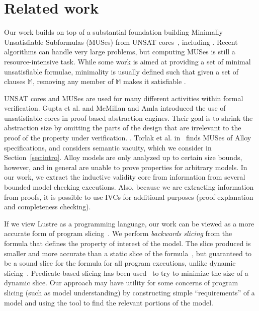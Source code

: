 \section{Related work}
\label{sec:related}


Our work builds on top of a substantial foundation building Minimally Unsatisfiable Subformulas
(MUSes) from UNSAT cores~\cite{Cimatti2007:UNSAT}, including \cite{marques2010minimal, belov2012towards, ryvchin2011faster, belov2012computing, nadel2010boosting}.  Recent algorithms can handle very large problems, but computing MUSes is still a resource-intensive task.  While some work is aimed at providing a set of minimal unsatisfiable formulae, minimality is usually defined such that given a set of clauses $\mathbb{M}$, removing any member of $\mathbb{M}$ makes it satisfiable \cite{belov2012computing}. 

UNSAT cores and MUSes are used for many different activities within formal verification.  Gupta et al. \cite{gupta2003iterative} and McMillan and Amla \cite{mcmillan2003automatic} introduced the use of unsatisfiable cores in proof-based abstraction engines. Their goal is to shrink the abstraction size by omitting the parts of the design that are irrelevant to the proof of the property under verification. .  Torlak et al. in~\cite{torlak2008finding} finds MUSes of Alloy specifications, and considers semantic vacuity, which we consider in Section~\ref{sec:intro}.  Alloy models are only analyzed up to certain size bounds, however, and in general are unable to prove properties for arbitrary models.  In our work, we extract the inductive validity core from information from several bounded model checking executions.  Also, because we are extracting information from proofs, it is possible to use IVCs for additional purposes (proof explanation and completeness checking).

If we view Lustre as a programming language, our work can be viewed as a more accurate form of program slicing~\cite{Tip95asurvey}.  We perform {\em backwards slicing} from the formula that defines the property of interest of the model.  The slice produced is smaller and more accurate than a static slice of the formula~\cite{Weiser:1981:slicing}, but guaranteed to be a sound slice for the formula for all program executions, unlike dynamic slicing~\cite{Agrawal:1990:slicing}.  Predicate-based slicing has been used~\cite{Li04:slicing} to try to minimize the size of a dynamic slice.  Our approach may have utility for some concerns of program slicing (such as model understanding) by constructing simple ``requirements'' of a model and using the tool to find the relevant portions of the model.

